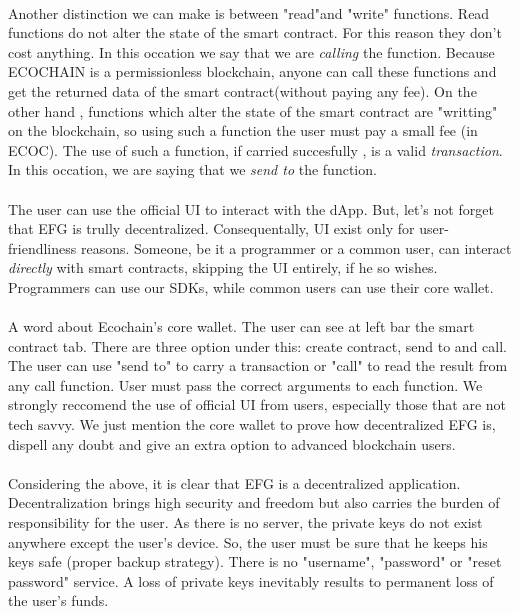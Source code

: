 \documentclass{article}
\begin{document}
\paragraph{ }
Another distinction we can make is between "read"and "write" functions. Read functions do not alter the state of the smart contract. For this reason they don't cost anything. In this occation we say that we are \emph{calling} the function. Because ECOCHAIN is a permissionless blockchain, anyone can call these functions and get the returned data of the smart contract(without paying any fee). On the other hand , functions which alter the state of the smart contract are "writting" on the blockchain, so using such a function the user must pay a small fee (in ECOC). The use of such a function, if carried succesfully , is a valid \emph{transaction}. In this occation, we are saying that we \emph{send to} the function.
\paragraph{ }
The user can use the official UI to interact with the dApp. But, let's not forget that EFG is trully decentralized. Consequentally, UI exist only for user-friendliness reasons. Someone, be it a programmer or a common user, can interact \emph{directly} with smart contracts, skipping the UI entirely, if he so wishes. Programmers can use our SDKs, while common users can use their core wallet.
\paragraph{ }
A word about Ecochain's core wallet. The user can see at left bar the smart contract tab. There are three option under this: create contract, send to and call. The user can use "send to" to carry a transaction or "call" to read the result from any call function. User must pass the correct arguments to each function. We strongly reccomend the use of official UI from users, especially those that are not tech savvy. We just mention the core wallet to prove how decentralized EFG is, dispell any doubt and give an extra option to advanced blockchain users.

\paragraph{ }
Considering the above, it is clear that EFG is a decentralized application. Decentralization brings high security and freedom but also carries the burden of responsibility for the user. As there is no server, the private keys do not exist anywhere except the user's device. So, the user must be sure that he keeps his keys safe (proper backup strategy). There is no "username", "password" or "reset password" service. A loss of private keys inevitably results to permanent loss of the user's funds.
\end{document}
